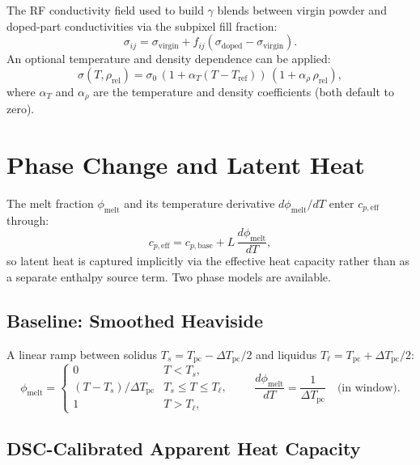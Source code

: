 \documentclass[11pt, letterpaper]{article}
\newcommand{\rhorel}{\rho_{\mathrm{rel}}}
\newcommand{\cpeff}{c_{p,\mathrm{eff}}}
\newcommand{\phimelt}{\phi_{\mathrm{melt}}}
\begin{document}
The RF conductivity field used to build $\gamma$ blends between virgin powder
and doped-part conductivities via the subpixel fill fraction:
%
\begin{equation}
  \sigma_{ij} = \sigma_{\mathrm{virgin}} + f_{ij}(\sigma_{\mathrm{doped}}-\sigma_{\mathrm{virgin}}).
\end{equation}
%
An optional temperature and density dependence can be applied:
%
\begin{equation}
  \sigma(T,\rhorel) = \sigma_0\,(1+\alpha_T(T-T_{\mathrm{ref}}))\,(1+\alpha_\rho\,\rhorel),
\end{equation}
%
where $\alpha_T$ and $\alpha_\rho$ are the temperature and density coefficients
(both default to zero).

\section{Phase Change and Latent Heat}

The melt fraction $\phimelt$ and its temperature derivative $d\phimelt/dT$
enter $\cpeff$ through:
%
\begin{equation}
  \cpeff = c_{p,\mathrm{base}} + L\,\frac{d\phimelt}{dT},
\end{equation}
%
so latent heat is captured implicitly via the effective heat capacity
rather than as a separate enthalpy source term.
Two phase models are available.

\subsection{Baseline: Smoothed Heaviside}

A linear ramp between solidus $T_s=T_{\mathrm{pc}}-\Delta T_{\mathrm{pc}}/2$
and liquidus $T_\ell=T_{\mathrm{pc}}+\Delta T_{\mathrm{pc}}/2$:
%
\begin{equation}
  \phimelt =
  \begin{cases}
    0 & T < T_s,\\
    (T-T_s)/\Delta T_{\mathrm{pc}} & T_s\le T\le T_\ell,\\
    1 & T > T_\ell,
  \end{cases}
  \qquad
  \frac{d\phimelt}{dT} = \frac{1}{\Delta T_{\mathrm{pc}}}\quad\text{(in window)}.
\end{equation}

\subsection{DSC-Calibrated Apparent Heat Capacity}
\end{document}
